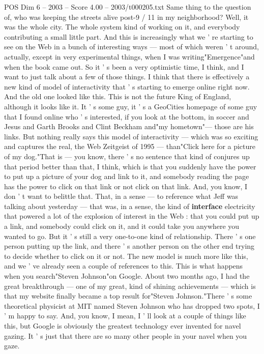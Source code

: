 \begin{textsample}{POS Dim 6 – 2003 – Score 4.00 – 2003/t000205.txt}
Same thing to the question of, who was keeping the streets alive post-9 / 11 in my neighborhood?
Well, it was the whole city.
The whole system kind of working on it, and everybody contributing a small little part.
And this is increasingly what we ' re starting to see on the Web in a bunch of interesting ways — most of which weren ' t around, actually, except in very experimental things, when I was writing"Emergence"and when the book came out.
So it ' s been a very optimistic time, I think, and I want to just talk about a few of those things.
I think that there is effectively a new kind of model of interactivity that ' s starting to emerge online right now.
And the old one looked like this.
This is not the future King of England, although it looks like it.
It ' s some guy, it ' s a GeoCities homepage of some guy that I found online who ' s interested, if you look at the bottom, in soccer and Jesus and Garth Brooks and Clint Beckham and"my hometown"— those are his links.
But nothing really says this model of interactivity — which was so exciting and captures the real, the Web Zeitgeist of 1995 — than"Click here for a picture of my dog."That is — you know, there ' s no sentence that kind of conjures up that period better than that, I think, which is that you suddenly have the power to put up a picture of your dog and link to it, and somebody reading the page has the power to click on that link or not click on that link.
And, you know, I don ' t want to belittle that.
That, in a sense — to reference what Jeff was talking about yesterday — that was, in a sense, the kind of \textbf{interface} electricity that powered a lot of the explosion of interest in the Web : that you could put up a link, and somebody could click on it, and it could take you anywhere you wanted to go.
But it ' s still a very one-to-one kind of relationship.
There ' s one person putting up the link, and there ' s another person on the other end trying to decide whether to click on it or not.
The new model is much more like this, and we ' ve already seen a couple of references to this.
This is what happens when you search"Steven Johnson"on Google.
About two months ago, I had the great breakthrough — one of my great, kind of shining achievements — which is that my website finally became a top result for"Steven Johnson."There ' s some theoretical physicist at MIT named Steven Johnson who has dropped two spots, I ' m happy to say.
And, you know, I mean, I ' ll look at a couple of things like this, but Google is obviously the greatest technology ever invented for navel gazing.
It ' s just that there are so many other people in your navel when you gaze.

\end{textsample}
